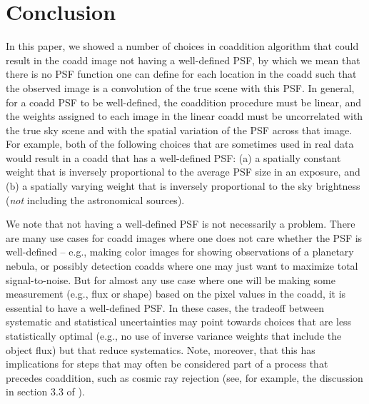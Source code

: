 \documentclass{aastex63}
\newcommand{\rachel}[1]{{\color{magenta}RM: #1}}
\newcommand{\mike}[1]{{\color{cyan}MJ: #1}}
\begin{document}
\section{Conclusion}

In this paper, we showed a number of choices in coaddition algorithm that could result
in the coadd image not having a well-defined PSF, by which we mean that there is no
PSF function one can define for each location in the coadd such that the observed image is a convolution
of the true scene with this PSF. In general, for a coadd PSF to be well-defined, the coaddition procedure must be linear, and the weights assigned to each image in the linear coadd must be uncorrelated with the true sky scene and with the spatial variation of the PSF across that image.  For example, both of the following choices that are sometimes used in real data would result in a coadd that has a well-defined PSF: (a) a spatially constant weight that is inversely proportional to the average PSF size in an exposure, and (b) a spatially varying weight that is inversely proportional to the sky brightness ({\em not} including the astronomical sources).  

We note that not having a well-defined PSF is not necessarily a problem.  There are many use cases for coadd images
where one does not care whether the PSF is well-defined -- e.g., making color images
for showing observations of a planetary nebula, or possibly detection coadds where one may just want to maximize total signal-to-noise.
But for almost any use case where one will
be making some measurement (e.g., flux or shape) based on the pixel values in the coadd,
it is essential to have a well-defined PSF.  In these cases, the tradeoff between systematic and statistical uncertainties may point towards choices that are less statistically optimal (e.g., no use of inverse variance weights that include the object flux) but that reduce systematics.  Note, moreover, that this has implications for steps that may often be considered part of a process that precedes coaddition, such as cosmic ray rejection (see, for example, the discussion in section 3.3 of \citealt{2018PASJ...70S...5B}).
\end{document}
